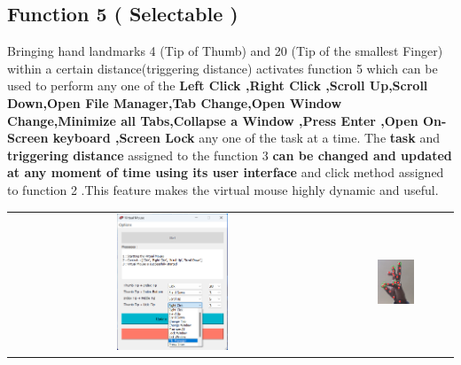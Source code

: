 \documentclass[12pt,a4paper]{report}
\begin{document}
		\subsection{Function 5 ( Selectable )}Bringing hand landmarks 4 (Tip of Thumb) and 20 (Tip of the smallest Finger) within a certain distance(triggering distance) activates function 5 which can be used to perform any one of the \textbf{Left Click ,Right Click ,Scroll Up,Scroll Down,Open File Manager,Tab Change,Open Window Change,Minimize all Tabs,Collapse a Window ,Press Enter ,Open On-Screen keyboard ,Screen Lock} any one of the task at a time. The \textbf{task} and \textbf{triggering distance} assigned to the function 3 \textbf{can be changed and updated at any moment of time using its user interface} and click method assigned to function 2 .This feature makes the virtual mouse highly dynamic and useful. \\
		    \begin{tabular}{c c}
 \includegraphics[width=0.35\textwidth]{action5f}&
 \includegraphics[width=0.35\textwidth]{action5} 
    \end{tabular}
		\label{Others}
\end{document}
